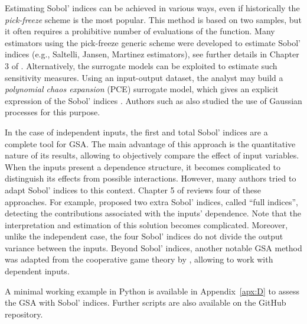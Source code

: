 Estimating Sobol' indices can be achieved in various ways, even if historically the \textit{pick-freeze} scheme is the most popular. 
This method is based on two samples, but it often requires a prohibitive number of evaluations of the function. 
Many estimators using the pick-freeze generic scheme were developed to estimate Sobol' indices (e.g., Saltelli, Jansen, Martinez estimators), see further details in Chapter 3 of \citet{daveiga_iooss_2021}. 
Alternatively, the surrogate models can be exploited to estimate such sensitivity measures. 
Using an input-output dataset, the analyst may build a \textit{polynomial chaos expansion} (PCE) surrogate model, which gives an explicit expression of the Sobol' indices \citep{sudret_2008}. 
Authors such as \citet{marrel_2009} also studied the use of Gaussian processes for this purpose. 
  
In the case of independent inputs, the first and total Sobol' indices are a complete tool for GSA. 
The main advantage of this approach is the quantitative nature of its results, allowing to objectively compare the effect of input variables. 
When the inputs present a dependence structure, it becomes complicated to distinguish its effects from possible interactions. 
However, many authors tried to adapt Sobol' indices to this context. 
Chapter 5 of \citet{daveiga_iooss_2021} reviews four of these approaches. 
For example, \citet{mara_tarantola_2012} proposed two extra Sobol' indices, called ``full indices'', detecting the contributions associated with the inputs' dependence. 
Note that the interpretation and estimation of this solution becomes complicated. 
Moreover, unlike the independent case, the four Sobol' indices do not divide the output variance between the inputs. 
Beyond Sobol' indices, another notable GSA method was adapted from the cooperative game theory by \citet{owen_2014_shapley}, allowing to work with dependent inputs.   

\begin{otexample}
    A minimal working example in Python is available in Appendix~\ref{apx:D} to assess the GSA with Sobol' indices. 
    Further scripts are also available on the GitHub repository\footnotemark.  
\end{otexample}

